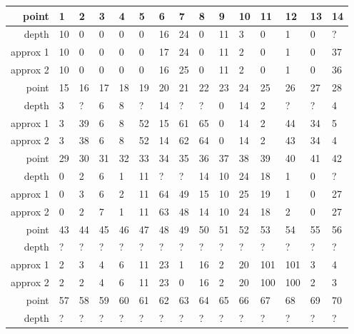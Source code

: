 \begin{center}
  \tablefirsthead{\hline}
  \tablelasttail{\hline}
  \begin{supertabular}{|r|l l l l l l l l l l l l l l|}
\hline
point & 1 & 2 & 3 & 4 & 5 & 6 & 7 & 8 & 9 & 10 & 11 & 12 & 13 & 14 \\
\hline
depth & 10 & 0 & 0 & 0 & 0 & 16 & 24 & 0 & 11 & 3 & 0 & 1 & 0 & ? \\
approx 1 & 10 & 0 & 0 & 0 & 0 & 17 & 24 & 0 & 11 & 2 & 0 & 1 & 0 & 37 \\
approx 2 & 10 & 0 & 0 & 0 & 0 & 16 & 25 & 0 & 11 & 2 & 0 & 1 & 0 & 36 \\
\hline
point & 15 & 16 & 17 & 18 & 19 & 20 & 21 & 22 & 23 & 24 & 25 & 26 & 27 & 28 \\
\hline
depth & 3 & ? & 6 & 8 & ? & 14 & ? & ? & 0 & 14 & 2 & ? & ? & 4 \\
approx 1 & 3 & 39 & 6 & 8 & 52 & 15 & 61 & 65 & 0 & 14 & 2 & 44 & 34 & 5 \\
approx 2 & 3 & 38 & 6 & 8 & 52 & 14 & 62 & 64 & 0 & 14 & 2 & 43 & 34 & 4 \\
\hline
point & 29 & 30 & 31 & 32 & 33 & 34 & 35 & 36 & 37 & 38 & 39 & 40 & 41 & 42 \\
\hline
depth & 0 & 2 & 6 & 1 & 11 & ? & ? & 14 & 10 & 24 & 18 & 1 & 0 & ? \\
approx 1 & 0 & 3 & 6 & 2 & 11 & 64 & 49 & 15 & 10 & 25 & 19 & 1 & 0 & 27 \\
approx 2 & 0 & 2 & 7 & 1 & 11 & 63 & 48 & 14 & 10 & 24 & 18 & 2 & 0 & 27 \\
\hline
point & 43 & 44 & 45 & 46 & 47 & 48 & 49 & 50 & 51 & 52 & 53 & 54 & 55 & 56 \\
\hline
depth & ? & ? & ? & ? & ? & ? & ? & ? & ? & ? & ? & ? & ? & ? \\
approx 1 & 2 & 3 & 4 & 6 & 11 & 23 & 1 & 16 & 2 & 20 & 101 & 101 & 3 & 4 \\
approx 2 & 2 & 2 & 4 & 6 & 11 & 23 & 0 & 16 & 2 & 20 & 100 & 100 & 2 & 3 \\
\hline
point & 57 & 58 & 59 & 60 & 61 & 62 & 63 & 64 & 65 & 66 & 67 & 68 & 69 & 70 \\
\hline
depth & ? & ? & ? & ? & ? & ? & ? & ? & ? & ? & ? & ? & ? & ? \\

\end{supertabular}
\end{center}
